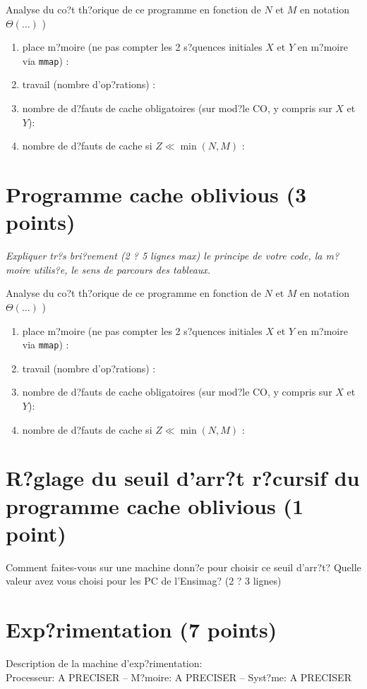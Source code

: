 \documentclass[10pt,a4paper]{article}
\begin{document}
Analyse du co?t th?orique de ce  programme en fonction de $N$ et $M$  en notation $\Theta(...)$ )
\begin{enumerate}
  \item place m?moire (ne pas compter les 2 s?quences initiales $X$ et $Y$ en m?moire via {\tt mmap}) : 
  \item travail (nombre d'op?rations) : 
  \item nombre de d?fauts de cache obligatoires (sur mod?le CO, y compris sur $X$ et $Y$):
  \item nombre de d?fauts de cache si $Z \ll \min(N,M)$ : 
\end{enumerate}

\section{Programme cache oblivious  (3 points)}
{\em Expliquer tr?s bri?vement (2 ? 5 lignes max) le principe de votre code, la m?moire utilis?e, le sens de parcours des tableaux.}
\vspace*{1.0cm}

Analyse du co?t th?orique de ce  programme en fonction de $N$ et $M$  en notation $\Theta(...)$ )
\begin{enumerate}
  \item place m?moire (ne pas compter les 2 s?quences initiales $X$ et $Y$ en m?moire via {\tt mmap}) : 
  \item travail (nombre d'op?rations) : 
  \item nombre de d?fauts de cache obligatoires (sur mod?le CO, y compris sur $X$ et $Y$):
  \item nombre de d?fauts de cache si $Z \ll \min(N,M)$ : 
\end{enumerate}

\section{R?glage du seuil d'arr?t r?cursif du programme cache oblivious  (1 point)} 
Comment faites-vous sur une machine donn?e pour choisir ce seuil d'arr?t? Quelle valeur avez vous choisi pour les
PC de l'Ensimag? (2 ? 3 lignes) 

\section{Exp?rimentation (7 points)}

Description de la machine d'exp?rimentation:  \\
Processeur: A PRECISER  --
M?moire: A PRECISER --
Syst?me: A PRECISER 
\end{document}
